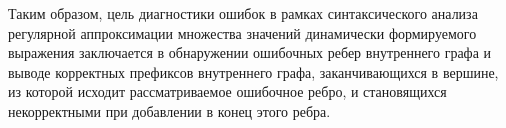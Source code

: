 Таким образом, цель диагностики ошибок в рамках синтаксического анализа регулярной аппроксимации множества значений динамически формируемого выражения заключается в обнаружении ошибочных ребер внутреннего графа и выводе корректных префиксов внутреннего графа, заканчивающихся в вершине, из которой исходит рассматриваемое ошибочное ребро, и становящихся некорректными при добавлении в конец этого ребра.
